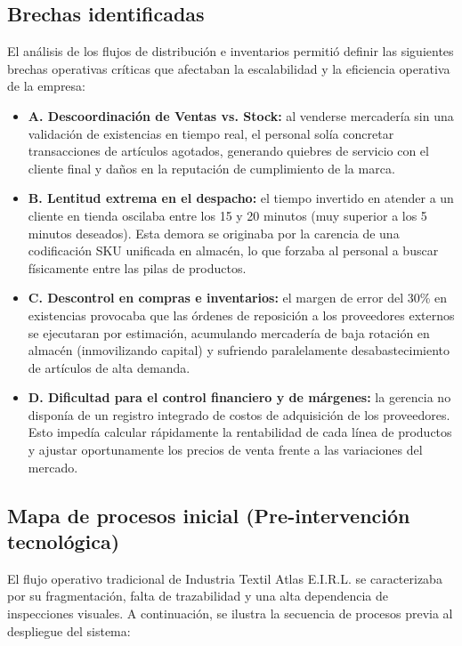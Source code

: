 \subsection{Brechas identificadas}
\begin{indentedsubsection}
El análisis de los flujos de distribución e inventarios permitió definir las siguientes brechas operativas críticas que afectaban la escalabilidad y la eficiencia operativa de la empresa:

\begin{itemize}
    \item \textbf{A. Descoordinación de Ventas vs. Stock:} al venderse mercadería sin una validación de existencias en tiempo real, el personal solía concretar transacciones de artículos agotados, generando quiebres de servicio con el cliente final y daños en la reputación de cumplimiento de la marca.
    \item \textbf{B. Lentitud extrema en el despacho:} el tiempo invertido en atender a un cliente en tienda oscilaba entre los 15 y 20 minutos (muy superior a los 5 minutos deseados). Esta demora se originaba por la carencia de una codificación SKU unificada en almacén, lo que forzaba al personal a buscar físicamente entre las pilas de productos.
    \item \textbf{C. Descontrol en compras e inventarios:} el margen de error del 30\% en existencias provocaba que las órdenes de reposición a los proveedores externos se ejecutaran por estimación, acumulando mercadería de baja rotación en almacén (inmovilizando capital) y sufriendo paralelamente desabastecimiento de artículos de alta demanda.
    \item \textbf{D. Dificultad para el control financiero y de márgenes:} la gerencia no disponía de un registro integrado de costos de adquisición de los proveedores. Esto impedía calcular rápidamente la rentabilidad de cada línea de productos y ajustar oportunamente los precios de venta frente a las variaciones del mercado.
\end{itemize}
\end{indentedsubsection}

\subsection{Mapa de procesos inicial (Pre-intervención tecnológica)}
\begin{indentedsubsection}
El flujo operativo tradicional de Industria Textil Atlas E.I.R.L. se caracterizaba por su fragmentación, falta de trazabilidad y una alta dependencia de inspecciones visuales. A continuación, se ilustra la secuencia de procesos previa al despliegue del sistema:
\end{indentedsubsection}

